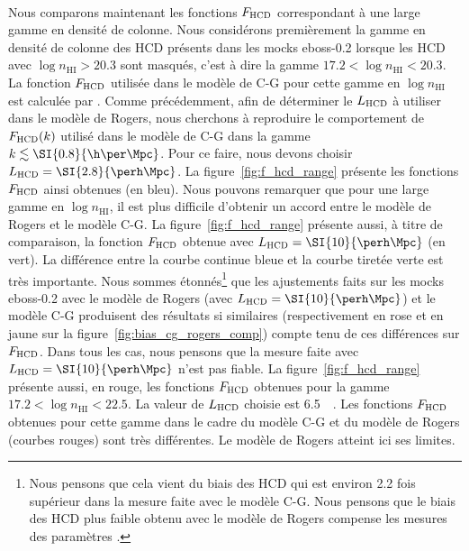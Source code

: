 \paragraph{}
Nous comparons maintenant les fonctions $F_{\textsc{HCD}}$ correspondant à une large gamme en densité de colonne.
Nous considérons premièrement la gamme en densité de colonne des HCD présents dans les mocks eboss-0.2 lorsque les HCD avec $\log n_{\mathrm{HI}} > \num{20.3}$ sont masqués, c'est à dire la gamme $\num{17.2} < \log n_{\mathrm{HI}} < \num{20.3}$. 
La fonction $F_{\textsc{HCD}}$ utilisée dans le modèle de C-G pour cette gamme en $\log n_{\mathrm{HI}}$ est calculée par \picca{}.
Comme précédemment, afin de déterminer le $L_{\textsc{HCD}}$ à utiliser dans le modèle de Rogers, nous cherchons à reproduire le comportement de $F_{\textsc{HCD}}(k)$ utilisé dans le modèle de C-G dans la gamme $k \lesssim \SI{0.8}{\h\per\Mpc}$. Pour ce faire, nous devons choisir $L_{\textsc{HCD}} = \SI{2.8}{\perh\Mpc}$.
La figure~\ref{fig:f_hcd_range} présente les fonctions $F_{\textsc{HCD}}$ ainsi obtenues (en bleu). Nous pouvons remarquer que pour une large gamme en $\log n_{\mathrm{HI}}$, il est plus difficile d'obtenir un accord entre le modèle de Rogers et le modèle C-G.
La figure~\ref{fig:f_hcd_range} présente aussi, à titre de comparaison, la  fonction $F_{\textsc{HCD}}$ obtenue avec $L_{\textsc{HCD}} = \SI{10}{\perh\Mpc}$ (en vert).
La différence entre la courbe continue bleue et la courbe tiretée verte est très importante. Nous sommes étonnés\footnote{Nous pensons que cela vient du biais des HCD qui est environ \num{2.2} fois supérieur dans la mesure faite avec le modèle C-G. Nous pensons que le biais des HCD plus faible obtenu avec le modèle de Rogers compense les mesures des paramètres \lya{}.} que les ajustements faits sur les mocks eboss-0.2 avec le modèle de Rogers (avec $L_{\textsc{HCD}} = \SI{10}{\perh\Mpc}$) et le modèle C-G produisent des résultats si similaires (respectivement en rose et en jaune sur la figure~\ref{fig:bias_cg_rogers_comp}) compte tenu de ces différences sur $F_{\textsc{HCD}}$.
  Dans tous les cas, nous pensons que la mesure faite avec $L_{\textsc{HCD}} = \SI{10}{\perh\Mpc}$ n'est pas fiable.
La figure~\ref{fig:f_hcd_range} présente aussi, en rouge, les fonctions $F_{\textsc{HCD}}$ obtenues pour la gamme $\num{17.2} < \log n_{\mathrm{HI}} < \num{22.5}$. La valeur de $L_{\textsc{HCD}}$ choisie est \SI{6.5}{\perh\Mpc}. Les fonctions $F_{\textsc{HCD}}$ obtenues pour cette gamme dans le cadre du modèle C-G et du modèle de Rogers (courbes rouges) sont très différentes. Le modèle de Rogers atteint ici ses limites.


